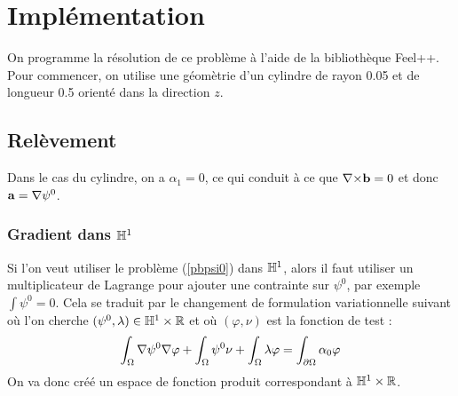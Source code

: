 \chapter{Implémentation}

On programme la résolution de ce problème à l'aide de la bibliothèque Feel++. Pour commencer, on utilise une géomètrie d'un cylindre de rayon 0.05 et de longueur 0.5 orienté dans la direction $z$.
\begin{center}
\end{center}

\section{Relèvement}

Dans le cas du cylindre, on a $\alpha_1=0$, ce qui conduit à ce que ${\nabla\times} \mathbf{b}=0$ et donc $\mathbf{a}={\nabla}\psi^0$.

\subsection{Gradient dans ${\mathbb{H}}^1$}
\label{gradh1}

Si l'on veut utiliser le problème (\ref{pbpsi0}) dans ${\mathbb{H}}^1$, alors il faut utiliser un multiplicateur de Lagrange pour ajouter une contrainte sur $\psi^0$, par exemple $\int \psi^0 = 0$. Cela se traduit par le changement de formulation variationnelle suivant où l'on cherche $(\psi^0,\lambda)\in {\mathbb{H}}^1\times{\mathbb{R}}$ et où $(\varphi,\nu)$ est la fonction de test :
\[
\int_\Omega{\nabla} \psi^0{\nabla}\varphi + \int_\Omega \psi^0\nu + \int_\Omega \lambda\varphi = \int_{\partial\Omega} \alpha_0\varphi
\]
On va donc créé un espace de fonction produit correspondant à ${\mathbb{H}}^1\times{\mathbb{R}}$.

